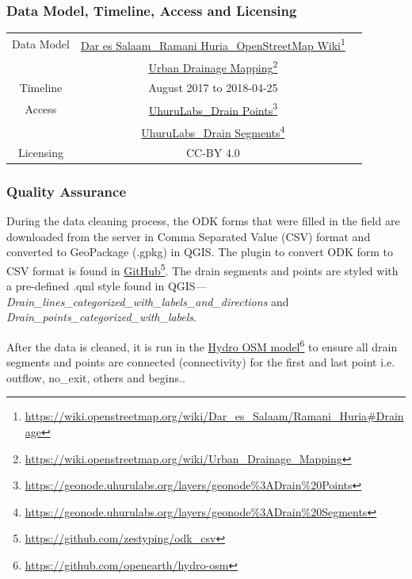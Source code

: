 \documentclass[a4paper,12pt,twoside]{article}
\begin{document}
\subsubsection{Data Model, Timeline, Access and Licensing}
\begin{center}
  \begin{tabular}{|c|c|c|}  
 \hline
    Data Model    &   \href{https://wiki.openstreetmap.org/wiki/Dar_es_Salaam/Ramani_Huria\#Drainage}{Dar es Salaam\_Ramani Huria\_OpenStreetMap Wiki}\footnote{\url{https://wiki.openstreetmap.org/wiki/Dar_es_Salaam/Ramani_Huria\#Drainage}}\\
    {} & \href{https://wiki.openstreetmap.org/wiki/Urban_Drainage_Mapping}{Urban Drainage Mapping}\footnote{\url{https://wiki.openstreetmap.org/wiki/Urban_Drainage_Mapping}}\\
\hline
   Timeline  & August 2017 to 2018-04-25 \\
\hline 
Access & {\href{https://geonode.uhurulabs.org/layers/geonode\%3ADrain\%20Points}{UhuruLabs\_Drain Points}\footnote{\url{https://geonode.uhurulabs.org/layers/geonode\%3ADrain\%20Points}}}\\
{} & {\href{https://geonode.uhurulabs.org/layers/geonode\%3ADrain\%20Segments}{UhuruLabs\_Drain Segments}\footnote{\url{https://geonode.uhurulabs.org/layers/geonode\%3ADrain\%20Segments}}} \\ 
 \hline      
  Licensing & CC-BY 4.0 \\
 \hline
\end{tabular}
\end{center}

\subsubsection{Quality Assurance}
During the data cleaning process, the ODK forms that were filled in the field are downloaded from the server in Comma Separated Value (CSV) format and converted to GeoPackage (.gpkg) in QGIS. The plugin to convert ODK form to CSV format is found in \href{https://github.com/zestyping/odk_csv}{GitHub}\footnote{\url{https://github.com/zestyping/odk\_csv}}. The drain segments and points are styled with a pre-defined .qml style found in QGIS---\textit{Drain\_lines\_categorized\_with\_labels\_and\_directions} and \textit{Drain\_points\_categorized\_with\_labels}.

After the data is cleaned, it is run in the \href{https://github.com/openearth/hydro-osm}{Hydro OSM model}\footnote{\url{https://github.com/openearth/hydro-osm}} to ensure all drain segments and points are connected  (connectivity) for the first and last point i.e. outflow, no\_exit, others and begins..
\end{document}
